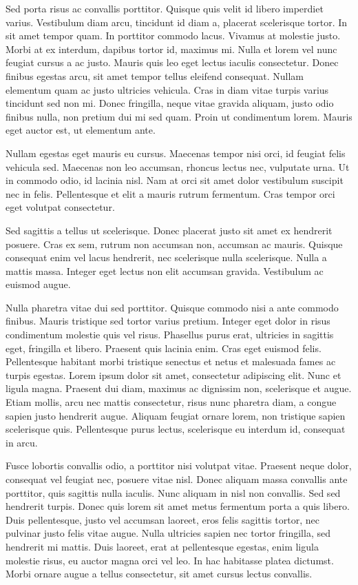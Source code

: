 Sed porta risus ac convallis porttitor. Quisque quis velit id libero imperdiet
varius. Vestibulum diam arcu, tincidunt id diam a, placerat scelerisque tortor.
In sit amet tempor quam. In porttitor commodo lacus. Vivamus at molestie justo.
Morbi at ex interdum, dapibus tortor id, maximus mi. Nulla et lorem vel nunc
feugiat cursus a ac justo. Mauris quis leo eget lectus iaculis consectetur.
Donec finibus egestas arcu, sit amet tempor tellus eleifend consequat. Nullam
elementum quam ac justo ultricies vehicula. Cras in diam vitae turpis varius
tincidunt sed non mi. Donec fringilla, neque vitae gravida aliquam, justo odio
finibus nulla, non pretium dui mi sed quam. Proin ut condimentum lorem. Mauris
eget auctor est, ut elementum ante.

Nullam egestas eget mauris eu cursus. Maecenas tempor nisi orci, id feugiat
felis vehicula sed. Maecenas non leo accumsan, rhoncus lectus nec, vulputate
urna. Ut in commodo odio, id lacinia nisl. Nam at orci sit amet dolor
vestibulum suscipit nec in felis. Pellentesque et elit a mauris rutrum
fermentum. Cras tempor orci eget volutpat consectetur.

Sed sagittis a tellus ut scelerisque. Donec placerat justo sit amet ex
hendrerit posuere. Cras ex sem, rutrum non accumsan non, accumsan ac mauris.
Quisque consequat enim vel lacus hendrerit, nec scelerisque nulla scelerisque.
Nulla a mattis massa. Integer eget lectus non elit accumsan gravida. Vestibulum
ac euismod augue.

Nulla pharetra vitae dui sed porttitor. Quisque commodo nisi a ante commodo
finibus. Mauris tristique sed tortor varius pretium. Integer eget dolor in
risus condimentum molestie quis vel risus. Phasellus purus erat, ultricies in
sagittis eget, fringilla et libero. Praesent quis lacinia enim. Cras eget
euismod felis. Pellentesque habitant morbi tristique senectus et netus et
malesuada fames ac turpis egestas. Lorem ipsum dolor sit amet, consectetur
adipiscing elit. Nunc et ligula magna. Praesent dui diam, maximus ac dignissim
non, scelerisque et augue. Etiam mollis, arcu nec mattis consectetur, risus
nunc pharetra diam, a congue sapien justo hendrerit augue. Aliquam feugiat
ornare lorem, non tristique sapien scelerisque quis. Pellentesque purus lectus,
scelerisque eu interdum id, consequat in arcu.

Fusce lobortis convallis odio, a porttitor nisi volutpat vitae. Praesent neque
dolor, consequat vel feugiat nec, posuere vitae nisl. Donec aliquam massa
convallis ante porttitor, quis sagittis nulla iaculis. Nunc aliquam in nisl non
convallis. Sed sed hendrerit turpis. Donec quis lorem sit amet metus fermentum
porta a quis libero. Duis pellentesque, justo vel accumsan laoreet, eros felis
sagittis tortor, nec pulvinar justo felis vitae augue. Nulla ultricies sapien
nec tortor fringilla, sed hendrerit mi mattis. Duis laoreet, erat at
pellentesque egestas, enim ligula molestie risus, eu auctor magna orci vel leo.
In hac habitasse platea dictumst. Morbi ornare augue a tellus consectetur, sit
amet cursus lectus convallis.

